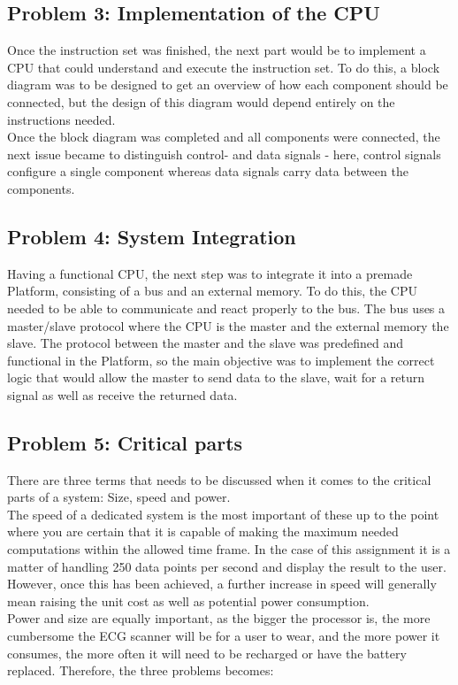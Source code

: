 \documentclass[12pt,a4paper]{article}
\begin{document}
\subsection{Problem 3: Implementation of the CPU}
	Once the instruction set was finished, the next part would be to implement a CPU that could understand and execute the instruction set. To do this, a block diagram was to be designed to get an overview of how each component should be connected, but the design of this diagram would depend entirely on the instructions needed.\\
	Once the block diagram was completed and all components were connected, the next issue became to distinguish control- and data signals - here, control signals configure a single component whereas data signals carry data between the components.\\
	
\subsection{Problem 4: System Integration}
	Having a functional CPU, the next step was to integrate it into a premade Platform, consisting of a bus and an external memory. To do this, the CPU needed to be able to communicate and react properly to the bus. The bus uses a master/slave protocol where the CPU is the master and the external memory the slave. The protocol between the master and the slave was predefined and functional in the Platform, 
	so the main objective was to implement the correct logic that would allow the master to send data to the slave, wait for a return signal as well as receive the returned data.\\
	
\subsection{Problem 5: Critical parts}
	There are three terms that needs to be discussed when it comes to the critical parts of a system: Size, speed and power.\\
	The speed of a dedicated system is the most important of these up to the point where you are certain that it is capable of making the maximum needed computations within the allowed time frame. In the case of this assignment it is a matter of handling 250 data points per second and display the result to the user. However, once this has been achieved, a further increase in speed will generally mean raising the unit cost as well as potential power consumption.\\
	Power and size are equally important, as the bigger the processor is, the more cumbersome the ECG scanner will be for a user to wear, and the more power it consumes, the more often it will need to be recharged or have the battery replaced. Therefore, the three problems becomes:
	
\end{document}
